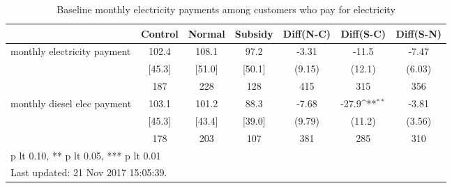 \begin{table}[htbp]\centering
\def\sym#1{\ifmmode^{#1}\else\(^{#1}\)\fi}
\caption{Baseline monthly electricity payments among customers who pay for electricity \label{tab:"balance"}}
\begin{tabular*}{1\hsize}{@{\hskip\tabcolsep\extracolsep\fill}l*{1}{cccccc}}
\toprule
                                &  Control&   Normal&  Subsidy&Diff(N-C)         &Diff(S-C)         &Diff(S-N)         \\
\midrule
monthly electricity payment     &    102.4&    108.1&     97.2&    -3.31         &    -11.5         &    -7.47         \\
                                &   [45.3]&   [51.0]&   [50.1]&   (9.15)         &   (12.1)         &   (6.03)         \\
                                &      187&      228&      128&      415         &      315         &      356         \\
monthly diesel elec payment     &    103.1&    101.2&     88.3&    -7.68         &    -27.9\sym{**} &    -3.81         \\
                                &   [45.3]&   [43.4]&   [39.0]&   (9.79)         &   (11.2)         &   (3.56)         \\
                                &      178&      203&      107&      381         &      285         &      310         \\
\bottomrule
\multicolumn{7}{l}{\footnotesize * p lt 0.10, ** p lt 0.05, *** p lt 0.01}\\
\multicolumn{7}{l}{\footnotesize Last updated: 21 Nov 2017 15:05:39.}\\
\end{tabular*}
\end{table}
